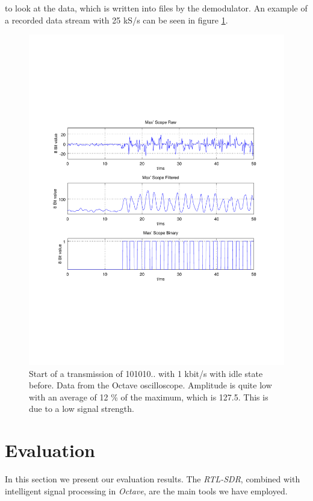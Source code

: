 \documentclass[conference]{IEEEtran}
\begin{document}
to look at the data, which is written into files by the demodulator. An
example of a recorded data stream with 25 kS/s can be seen in figure
\ref{fig:transmission}.  \begin{figure}[h]
\centering
\includegraphics[width=\columnwidth]{./fig/transmission}
\caption{Start of a transmission of 101010.. with 1 kbit/s with idle state before. Data from the Octave oscilloscope. Amplitude is quite low with an average of 12 \% of the maximum, which is 127.5. This is due to a low signal strength.}
\label{fig:transmission}
\end{figure}

\section{Evaluation}
In this section we present our evaluation results. The \textit{RTL-SDR}, combined with intelligent signal processing in \textit{Octave}, are the main tools we have employed. 
\end{document}
